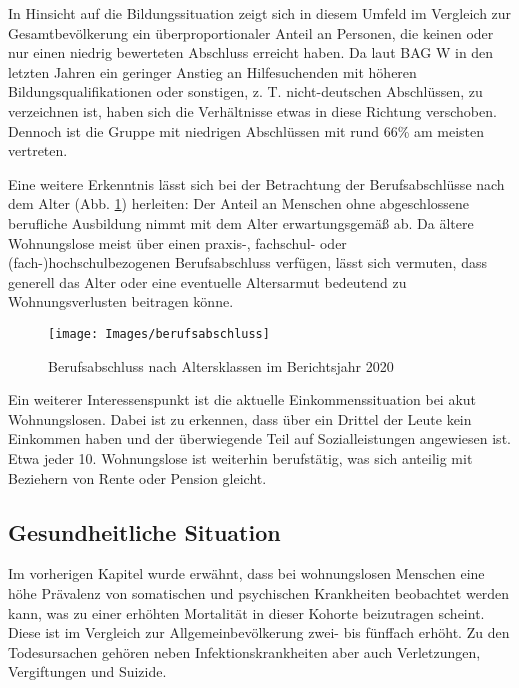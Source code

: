 In Hinsicht auf die Bildungssituation zeigt sich in diesem Umfeld im Vergleich zur Gesamtbevölkerung ein überproportionaler Anteil an Personen, die keinen oder nur einen niedrig bewerteten Abschluss erreicht haben. Da laut \ac{BAG W} in den letzten Jahren ein geringer Anstieg an Hilfesuchenden mit höheren Bildungsqualifikationen oder sonstigen, z. T. nicht-deutschen Abschlüssen, zu verzeichnen ist, haben sich die Verhältnisse etwas in diese Richtung verschoben. Dennoch ist die Gruppe mit niedrigen Abschlüssen mit rund 66\% am meisten vertreten.

Eine weitere Erkenntnis lässt sich bei der Betrachtung der Berufsabschlüsse nach dem Alter (Abb. \ref{fig:berufsabschluss}) herleiten: Der Anteil an Menschen ohne abgeschlossene berufliche Ausbildung nimmt mit dem Alter erwartungsgemäß ab. Da ältere Wohnungslose meist über einen praxis-, fachschul- oder (fach-)hochschulbezogenen Berufsabschluss verfügen, lässt sich vermuten, dass generell das Alter oder eine eventuelle Altersarmut bedeutend zu Wohnungsverlusten beitragen könne.

\begin{figure}[h]
	\centering
	\texttt{[image: Images/berufsabschluss]}
	\caption[Berufsabschluss nach Alter]{Berufsabschluss nach Altersklassen im Berichtsjahr 2020 \citep[S. 14]{BAGW.2022}}
	\label{fig:berufsabschluss}
\end{figure}

Ein weiterer Interessenspunkt ist die aktuelle Einkommenssituation bei akut Wohnungslosen. Dabei ist zu erkennen, dass über ein Drittel der Leute kein Einkommen haben und der überwiegende Teil auf Sozialleistungen angewiesen ist. Etwa jeder 10. Wohnungslose ist weiterhin berufstätig, was sich anteilig mit Beziehern von Rente oder Pension gleicht.

\subsection{Gesundheitliche Situation}

Im vorherigen Kapitel wurde erwähnt, dass bei wohnungslosen Menschen eine höhe Prävalenz von somatischen und psychischen Krankheiten beobachtet werden kann, was zu einer erhöhten Mortalität in dieser Kohorte beizutragen scheint. Diese ist im Vergleich zur Allgemeinbevölkerung zwei- bis fünffach erhöht. \citep[vgl.]{DAE228829} Zu den Todesursachen gehören neben Infektionskrankheiten aber auch Verletzungen, Vergiftungen und Suizide. \citep{Beijer.2011}

